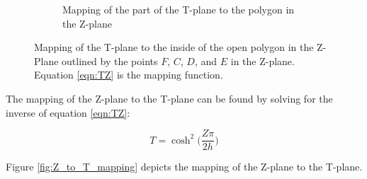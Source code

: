 \begin{figure}[h]
\begin{subfigure}[t]{0.45\textwidth}
        \caption{Mapping of the part of the T-plane to the polygon in the Z-plane}
    \end{subfigure} 
    \caption[Mapping of the T-plane to the inside of the open polygon in the Z-Plane]{Mapping of the T-plane to the inside of the open polygon in the Z-Plane outlined by the points $F$, $C$, $D$, and $E$ in the Z-plane. Equation \ref{eqn:TZ} is the mapping function.} 
    \label{fig:T_to_Z_mapping}
 \end{figure}

\par The mapping of the Z-plane to the T-plane can be found by solving for the inverse of equation \ref{eqn:TZ}:

\begin{equation}
     T = \cosh^2\bigg(\frac{Z\pi}{2h}\bigg)
     \label{eqn:ZT}
 \end{equation}

\noindent Figure \ref{fig:Z_to_T_mapping} depicts the mapping of the Z-plane to the T-plane.

